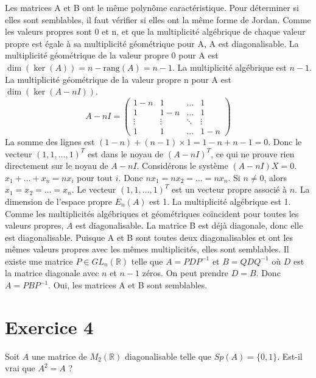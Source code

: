 \begin{solution}
Les matrices A et B ont le même polynôme caractéristique.
Pour déterminer si elles sont semblables, il faut vérifier si elles ont la même forme de Jordan. Comme les valeurs propres sont 0 et n, et que la multiplicité algébrique de chaque valeur propre est égale à sa multiplicité géométrique pour A, A est diagonalisable.
La multiplicité géométrique de la valeur propre 0 pour A est $\dim(\ker(A)) = n - \text{rang}(A) = n-1$. La multiplicité algébrique est $n-1$.
La multiplicité géométrique de la valeur propre n pour A est $\dim(\ker(A-nI))$.
\[ A-nI = \begin{pmatrix} 1-n & 1 & \dots & 1 \\ 1 & 1-n & \dots & 1 \\ \vdots & \vdots & \ddots & \vdots \\ 1 & 1 & \dots & 1-n \end{pmatrix} \]
La somme des lignes est $(1-n) + (n-1) \times 1 = 1-n+n-1 = 0$. Donc le vecteur $(1, 1, \dots, 1)^T$ est dans le noyau de $(A-nI)^T$, ce qui ne prouve rien directement sur le noyau de $A-nI$.
Considérons le système $(A-nI)X = 0$. $x_1 + \dots + x_n = nx_i$ pour tout $i$. Donc $nx_1 = nx_2 = \dots = nx_n$. Si $n \ne 0$, alors $x_1 = x_2 = \dots = x_n$. Le vecteur $(1,1,\dots,1)^T$ est un vecteur propre associé à $n$. La dimension de l'espace propre $E_n(A)$ est 1. La multiplicité algébrique est 1.
Comme les multiplicités algébriques et géométriques coïncident pour toutes les valeurs propres, $A$ est diagonalisable.
La matrice B est déjà diagonale, donc elle est diagonalisable.
Puisque A et B sont toutes deux diagonalisables et ont les mêmes valeurs propres avec les mêmes multiplicités, elles sont semblables. Il existe une matrice $P \in GL_n(\mathbb{R})$ telle que $A = P D P^{-1}$ et $B = Q D Q^{-1}$ où $D$ est la matrice diagonale avec $n$ et $n-1$ zéros. On peut prendre $D=B$. Donc $A = P B P^{-1}$.
Oui, les matrices A et B sont semblables.
\end{solution}

\section{Exercice 4}
Soit $A$ une matrice de $M_2(\mathbb{R})$ diagonalisable telle que $Sp(A) = \{0, 1\}$. Est-il vrai que $A^2 = A$ ?


